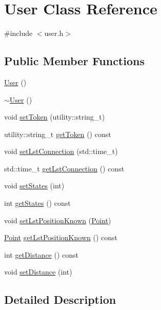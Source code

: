 \hypertarget{class_user}{\section{User Class Reference}
\label{class_user}
}


{\ttfamily \#include $<$user.\+h$>$}

\subsection*{Public Member Functions}
\begin{DoxyCompactItemize}
\item 
\hyperlink{class_user_a4a0137053e591fbb79d9057dd7d2283d}{User} ()
\item 
\hyperlink{class_user_ac00b72ad64eb4149f7b21b9f5468c2b2}{$\sim$\+User} ()
\item 
void \hyperlink{class_user_aa91df7f38b7e0481c67c79c4a26eda41}{set\+Token} (utility\+::string\+\_\+t)
\item 
utility\+::string\+\_\+t \hyperlink{class_user_adedf47b8676b704356195cf67ed03be4}{get\+Token} () const 
\item 
void \hyperlink{class_user_a3ebf49004b7a0aa9bec881b1470d0b51}{set\+Lst\+Connection} (std\+::time\+\_\+t)
\item 
std\+::time\+\_\+t \hyperlink{class_user_aa5285ef5ca526f2e23bcea453c748896}{get\+Lst\+Connection} () const 
\item 
void \hyperlink{class_user_a7d2aee609fe856b9162cf51b54d15561}{set\+States} (int)
\item 
int \hyperlink{class_user_a65fa6e9c7df52bf25206bef1cb00d8a6}{get\+States} () const 
\item 
void \hyperlink{class_user_aa28248264f5bff18ca173c5575ecd0eb}{set\+Lst\+Position\+Known} (\hyperlink{class_point}{Point})
\item 
\hyperlink{class_point}{Point} \hyperlink{class_user_ac3f4b47d1262a3bda6ff380dbd10a58d}{get\+Lst\+Position\+Known} () const 
\item 
int \hyperlink{class_user_a3f137c7a04dadc52705992f1c59d2a5c}{get\+Distance} () const 
\item 
void \hyperlink{class_user_a641d8b376db499805341384fce817a4f}{set\+Distance} (int)
\end{DoxyCompactItemize}


\subsection{Detailed Description}


